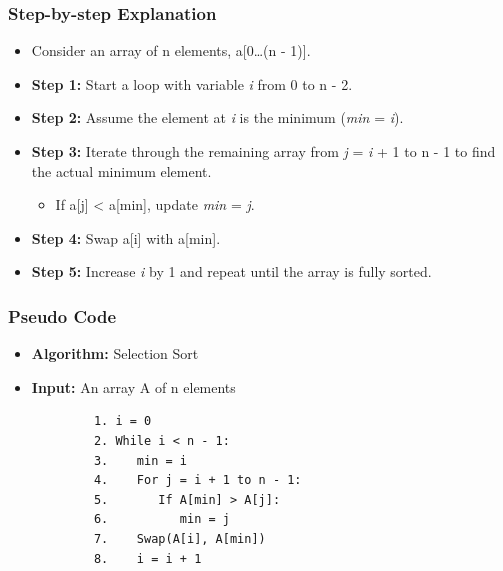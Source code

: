     \subsubsection{Step-by-step Explanation}
        \begin{itemize}
            \item Consider an array of n elements, a[0\ldots (n - 1)].
            \item \textbf{Step 1:} Start a loop with variable \textit{i} from 0 to n - 2.
            \item \textbf{Step 2:} Assume the element at \textit{i} is the minimum (\textit{min} = \textit{i}).
            \item \textbf{Step 3:} Iterate through the remaining array from \textit{j} = \textit{i} + 1 to n - 1 to find the actual minimum element.
            \begin{itemize}
                \item If a[j] < a[min], update \textit{min} = \textit{j}.
            \end{itemize}
            \item \textbf{Step 4:} Swap a[i] with a[min].
            \item \textbf{Step 5:} Increase \textit{i} by 1 and repeat until the array is fully sorted.
        \end{itemize}

    \subsubsection{Pseudo Code}
        \begin{itemize}
            \item \textbf{Algorithm:} Selection Sort
            \item \textbf{Input:} An array A of n elements
        \end{itemize}
        \begin{verbatim}
            1. i = 0
            2. While i < n - 1:
            3.    min = i
            4.    For j = i + 1 to n - 1:
            5.       If A[min] > A[j]:
            6.          min = j
            7.    Swap(A[i], A[min])
            8.    i = i + 1
        \end{verbatim}
